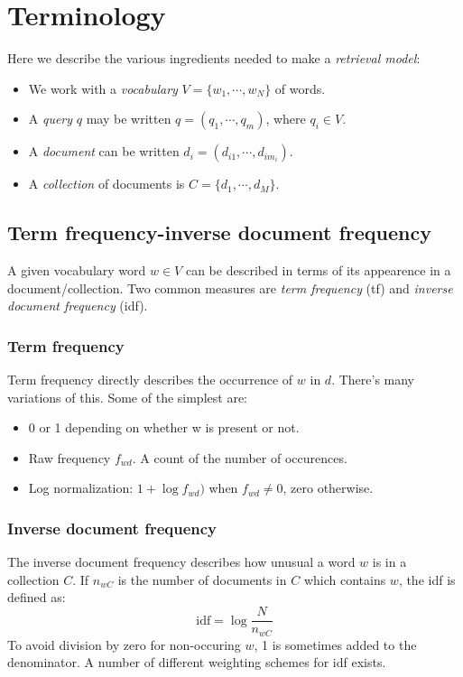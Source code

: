 \documentclass[12pt, a4paper]{article}
\numberwithin{equation}{section}
\begin{document}
\section{Terminology}
Here we describe the various ingredients needed to make a \textit{retrieval model}:
\begin{itemize}
\item We work with a \textit{vocabulary} $V=\{w_1,\cdots,w_N\}$ of words.
\item A \textit{query} $q$ may be written $q=(q_1,\cdots,q_m)$, where $q_i\in V$.
\item A \textit{document} can be written $d_i=(d_{i1},\cdots,d_{im_i})$.
\item A \textit{collection} of documents is $C=\{d_1,\cdots,d_M\}$.
\end{itemize}

\subsection{Term frequency-inverse document frequency}
A given vocabulary word $w\in V$ can be described in terms of its appearence in a document/collection. Two common measures are \textit{term frequency} (tf) and \textit{inverse document frequency} (idf).

\subsubsection{Term frequency}
Term frequency directly describes the occurrence of $w$ in $d$. There's many variations of this. Some of the simplest are:
\begin{itemize}
\item 0 or 1 depending on whether w is present or not.
\item Raw frequency $f_{wd}$. A count of the number of occurences.
\item Log normalization: $1+\log f_{wd})$ when $f_{wd}\neq 0$, zero otherwise.
\end{itemize}

\subsubsection{Inverse document frequency}
The inverse document frequency describes how unusual a word $w$ is in a collection $C$. If $n_{wC}$ is the number of documents in $C$ which contains $w$, the idf is defined as:
\begin{equation}
\textrm{idf}=\log\frac{N}{n_{wC}}
\end{equation}
To avoid division by zero for non-occuring $w$, 1 is sometimes added to the denominator. A number of different weighting schemes for idf exists. 
\end{document}
